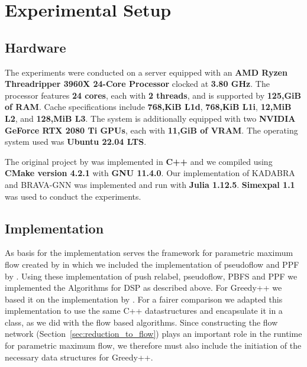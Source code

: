 \chapter{Experimental Setup}


\section{Hardware}

The experiments were conducted on a server equipped with an \textbf{AMD Ryzen Threadripper 3960X 24-Core Processor} clocked at \textbf{3.80 GHz}.
The processor features \textbf{24 cores}, each with \textbf{2 threads}, and is supported by \textbf{125,GiB of RAM}.
Cache specifications include \textbf{768,KiB L1d}, \textbf{768,KiB L1i}, \textbf{12,MiB L2}, and \textbf{128,MiB L3}.
The system is additionally equipped with two \textbf{NVIDIA GeForce RTX 2080 Ti GPUs}, each with \textbf{11,GiB of VRAM}.
The operating system used was \textbf{Ubuntu 22.04 LTS}.

The original project by \textcite{borassi_kadabra_2019} was implemented in \textbf{C++} and we compiled using \textbf{CMake version 4.2.1} with \textbf{GNU 11.4.0}.
Our implementation of KADABRA and BRAVA-GNN was implemented and run with \textbf{Julia 1.12.5}.
\textbf{Simexpal 1.1}~\parencite{simexpal2019} was used to conduct the experiments.


\section{Implementation}\label{sec:implementation}
As basis for the implementation serves the framework for parametric maximum flow created by \textcite{beines_simpler_2024} in which we included the implementation of
pseudoflow and PPF by \textcite{Sauer_PPF_2025}.
Using these implementation of push relabel, pseudoflow, PBFS and PPF we implemented the Algorithms for DSP as described above.
For Greedy++ we based it on the implementation by \textcite{boob_flowless_2020}.
For a fairer comparison we adapted this implementation to use the same C++ datastructures and encapsulate it in a class, as
we did with the flow based algorithms.
Since constructing the flow network (Section~\ref{sec:reduction_to_flow}) plays an important role in the runtime for parametric maximum flow,
we therefore must also include the initiation of the necessary data structures for Greedy++.


